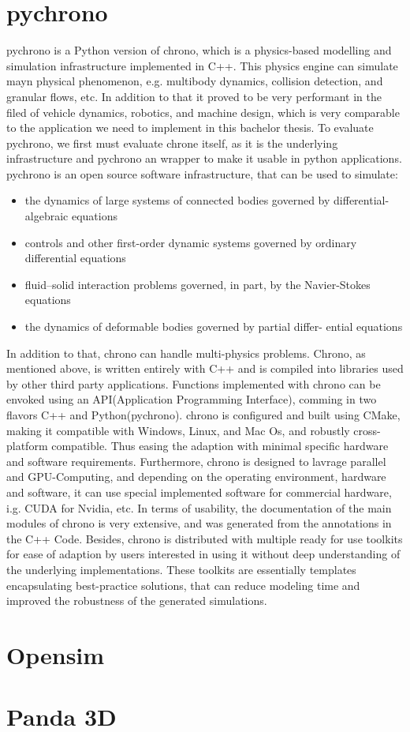 \documentclass[
	12pt, 
	a4paper, 
]{article}
\begin{document}
	\section{pychrono}
	pychrono is a Python version of chrono, which is a physics-based modelling and simulation infrastructure implemented in C++. This physics engine can simulate mayn physical phenomenon, e.g. multibody dynamics, collision detection, and granular flows, etc. In addition to that it proved to be very performant in the filed of vehicle dynamics, robotics, and machine design,\cite{tasora2020chrono} which is very comparable to the application we need to implement in this bachelor thesis. To evaluate pychrono, we first must evaluate chrone itself, as it is the underlying infrastructure and pychrono an wrapper to make it usable in python applications.\newline
	pychrono is an open source software infrastructure, that can be used to simulate\cite{tasora2020chrono}:
	\begin{itemize}
		\item the dynamics of large systems of connected bodies governed by differential-algebraic equations
		\item controls and other first-order dynamic systems governed by ordinary differential equations
		\item fluid–solid interaction problems governed, in part, by the Navier-Stokes equations
		\item the dynamics of deformable bodies governed by partial differ- ential equations
	\end{itemize}
	In addition to that, chrono can handle multi-physics problems. Chrono, as mentioned above, is written entirely with C++ and is compiled into libraries used by other third party applications. Functions implemented with chrono can be envoked using an API(Application Programming Interface), comming in two flavors C++ and Python(pychrono). chrono is configured and built using CMake, making it compatible with Windows, Linux, and Mac Os, and robustly cross-platform compatible. Thus easing the adaption with minimal specific hardware and software requirements. Furthermore, chrono is designed to lavrage parallel and GPU-Computing, and depending on the operating environment, hardware and software, it can use special implemented software for commercial hardware, i.g. CUDA for Nvidia, etc. In terms of usability, the documentation of the main modules of chrono is very extensive, and was generated from the annotations in the C++ Code. Besides, chrono is distributed with multiple ready for use toolkits for ease of adaption by users interested in using it without deep understanding of the underlying implementations. These toolkits are essentially templates encapsulating best-practice solutions, that can reduce modeling time and improved the robustness of the generated simulations\cite{tasora2020chrono}.\newline

	\section{Opensim}
	\section{Panda 3D}
	\printbibliography
\end{document}
